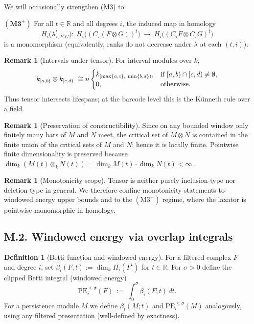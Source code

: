 \documentclass[11pt]{article}
\numberwithin{equation}{section}
\theoremstyle{plain}
\theoremstyle{definition}
\theoremstyle{remark}
\newcommand{\RR}{\mathbb{R}}
\theoremstyle{plain}
\theoremstyle{definition}
\newcommand{\kk}{k}
\newcommand{\PE}{\mathrm{PE}}
\newcommand{\betti}{\beta}
\newcommand{\CT}{C_{\tau}}
\numberwithin{equation}{section}
\theoremstyle{definition}
\newtheorem{definition}[theorem]{Definition}
\newtheorem{remark}[theorem]{Remark}
\numberwithin{equation}{section}
\theoremstyle{plain}
\theoremstyle{definition}
\theoremstyle{remark}
\providecommand{\n}{\unskip\space}
\begin{document}
We will occasionally strengthen (M3) to:

\medskip
\noindent
\(\mathbf{(M3^+)}\) For all \(t\in\RR\) and all degrees \(i\), the induced map in homology
\[
  H_i\big(\lambda_{\tau,F,G}^t\big):\ H_i\big((\CT(F\otimes G))^t\big)\ \longrightarrow\ H_i\big((\CT F\otimes \CT G)^t\big)
\]
is a monomorphism (equivalently, ranks do not decrease under \(\lambda\) at each \((t,i)\)).

\begin{remark}[Intervals under tensor]\label{rem:interval-tensor}
For interval modules over \(\kk\),
\[
  \kk_{[a,b)}\otimes \kk_{[c,d)} \ \cong\\n  \begin{cases}
     \kk_{[\max\{a,c\},\ \min\{b,d\})}, & \text{if } [a,b)\cap[c,d)\neq\emptyset,\\\n    0, & \text{otherwise}.\n  \end{cases}
\]
Thus tensor intersects lifespans; at the barcode level this is the K\"unneth rule over a field.
\end{remark}

\begin{remark}[Preservation of constructibility]\label{rem:constructible}
Since on any bounded window only finitely many bars of \(M\) and \(N\) meet, the critical set of \(M\otimes N\) is contained in the finite union of the critical sets of \(M\) and \(N\); hence it is locally finite. Pointwise finite dimensionality is preserved because \(\dim_\kk (M(t)\otimes_\kk N(t)) = \dim_\kk M(t)\cdot \dim_\kk N(t) < \infty\).
\end{remark}

\begin{remark}[Monotonicity scope]
Tensor is neither purely inclusion-type nor deletion-type in general. We therefore confine monotonicity statements to windowed energy upper bounds and to the \((\mathrm{M3}^+)\) regime, where the laxator is pointwise monomorphic in homology.
\end{remark}

\bigskip

\subsection*{M.2. Windowed energy via overlap integrals}

\begin{definition}[Betti function and windowed energy]
For a filtered complex \(F\) and degree \(i\), set \(\betti_i(F;t):=\dim_\kk H_i(F^t)\) for \(t\in\RR\). For \(\sigma>0\) define the clipped Betti integral (windowed energy)
\[
  \PE_i^{\le \sigma}(F)\ :=\ \int_0^\sigma \betti_i(F;t)\,dt.
\]
For a persistence module \(M\) we define \(\betti_i(M;t)\) and \(\PE_i^{\le\sigma}(M)\) analogously, using any filtered presentation (well-defined by exactness).
\end{definition}
\end{document}
